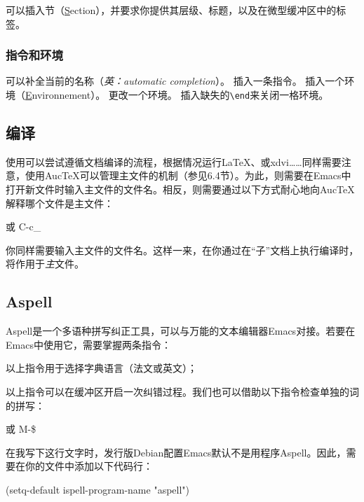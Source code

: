 可以插入节（\underline{S}ection），并要求你提供其层级、标题，以及在微型缓冲区中的标签。%

\subsubsection{指令和环境}

可以补全当前的名称（\emph{英：automatic completion}）。
插入一条指令。
插入一个环境（\underline{E}nvironnement）。
更改一个环境。
\fbox{\dm{C-c ]}}插入缺失的\verb+\end+来关闭一格环境。

\subsection{编译}

使用可以尝试遵循文档编译的流程，根据情况运行\LaTeX 、\bib 或\textsf{xdvi}……同样需要注意，使用Auc\TeX 可以管理主文件的机制（参见6.4节）。为此，则需要在\textsf{Emacs}中打开新文件时输入主文件的文件名。相反，则需要通过以下方式耐心地向Auc\TeX 解释哪个文件是主文件：

\textrm{ 或 }\textsf{C-c\_}%

你同样需要输入主文件的文件名。这样一来，在你通过在“子”文档上执行编译时，将作用于\emph{主}文件。

\subsection{Aspell}

\textsf{Aspell}是一个多语种拼写纠正工具，可以与万能的文本编辑器\textsf{Emacs}对接。若要在\textsf{Emacs}中使用它，需要掌握两条指令：


以上指令用于选择字典语言（法文或英文）；


以上指令可以在缓冲区开启一次纠错过程。我们也可以借助以下指令检查单独的词的拼写：

\textrm{或 }\textsf{M-\$}

\begin{exclamation}
在我写下这行文字时，发行版Debian配置Emacs默认不是用程序Aspell。因此，需要在你的文件中添加以下代码行：

\begin{dmd}
(setq-default ispell-program-name "aspell")
\end{dmd}
\end{exclamation}

